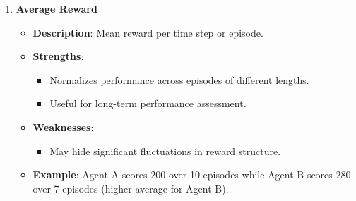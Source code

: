 \documentclass{beamer}
\begin{document}
\begin{frame}[fragile]
\begin{enumerate}
        \item \textbf{Average Reward}
            \begin{itemize}
                \item \textbf{Description}: Mean reward per time step or episode.
                \item \textbf{Strengths}:
                    \begin{itemize}
                        \item Normalizes performance across episodes of different lengths.
                        \item Useful for long-term performance assessment.
                    \end{itemize}
                \item \textbf{Weaknesses}:
                    \begin{itemize}
                        \item May hide significant fluctuations in reward structure.
                    \end{itemize}
                \item \textbf{Example}: Agent A scores 200 over 10 episodes while Agent B scores 280 over 7 episodes (higher average for Agent B).
            \end{itemize}
    \end{enumerate}
\end{frame}
\end{document}
